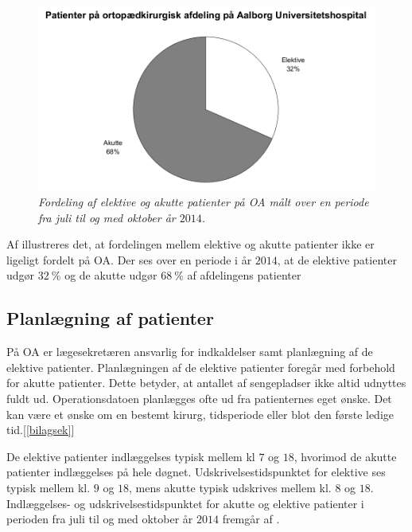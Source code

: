 \begin{figure}[H]
	\flushleft 
	\centering
	\includegraphics[scale=0.55]{figures/elektivvsakut.png}
	\flushleft
	\caption{\textit{Fordeling af elektive og akutte patienter på OA målt over en periode fra juli til og med oktober år $2014$.}\cite{REOS}}
	\label{elektivvsakut}
	\end{figure}

\noindent
Af  illustreres det, at fordelingen mellem elektive og akutte patienter ikke er ligeligt fordelt på OA. Der ses over en periode i år $2014$, at de elektive patienter udgør $32~\%$ og de akutte udgør $68~\%$ af afdelingens patienter \\

\subsection{Planlægning af patienter} \label{book}
På OA er lægesekretæren ansvarlig for indkaldelser samt planlægning af de elektive patienter. Planlægningen af de elektive patienter foregår med forbehold for akutte patienter. Dette betyder, at antallet af sengepladser ikke altid udnyttes fuldt ud. Operationsdatoen planlægges ofte ud fra patienternes eget ønske. Det kan være et ønske om en bestemt kirurg, tidsperiode eller blot den første ledige tid.[\ref{bilagsek}]

\noindent
De elektive patienter indlæggelses typisk mellem kl $7$ og $18$, hvorimod de akutte patienter indlæggelses på hele døgnet. Udskrivelsestidspunktet for elektive ses typisk mellem kl. $9$ og $18$, mens akutte typisk udskrives mellem kl. $8$ og $18$. Indlæggelses- og udskrivelsestidspunktet for akutte og elektive patienter i perioden fra juli til og med oktober år $2014$ fremgår af .\cite{REOS}

